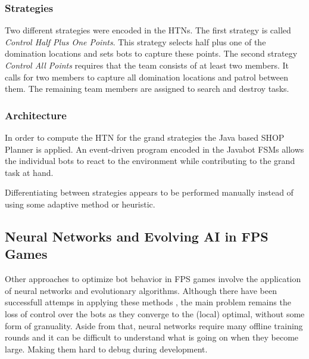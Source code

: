 \subsubsection{Strategies}
Two different strategies were encoded in the HTNs. The first strategy is called
\emph{Control Half Plus One Points}. This strategy selects half plus one of the
domination locations and sets bots to capture these points. The second strategy
\emph{Control All Points} requires that the team consists of at least two
members. It calls for two members to capture all domination locations and
patrol between them. The remaining team members are assigned to search and
destroy tasks.

\subsubsection{Architecture}
In order to compute the HTN for the grand strategies the Java based SHOP
Planner\cite{shop} is applied. An event-driven program encoded in the Javabot
FSMs allows the individual bots to react to the environment while contributing
to the grand task at hand. 

Differentiating between strategies appears to be performed manually instead of
using some adaptive method or heuristic.

\subsection{Neural Networks and Evolving AI in FPS Games}
Other approaches to optimize bot behavior in FPS games involve the application
of neural networks and evolutionary algorithms. Although there have been
successfull attemps in applying these methods \cite{ENNQ3,hclfps,ECBU}, the
main problem remains the loss of control over the bots as they converge to the
(local) optimal, without some form of granuality. Aside from that, neural
networks require many offline training rounds and it can be difficult to
understand what is going on when they become large. Making them hard to debug
during development.
